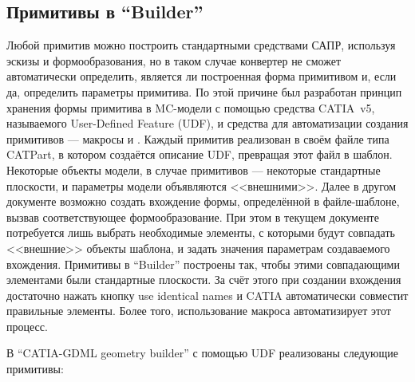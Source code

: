 %                                                

\subsection{Примитивы в ``Builder''}\label{sec:Primitives}

Любой примитив можно построить стандартными средствами САПР, используя эскизы и формообразования, но в таком случае конвертер не сможет автоматически определить, является ли построенная форма примитивом и, если да, определить параметры примитива. По этой причине был разработан принцип хранения формы примитива в MC-модели с помощью средства CATIA~v5, называемого User-Defined Feature (UDF), и средства для автоматизации создания примитивов --- макросы  и . Каждый примитив реализован в своём файле типа CATPart, в котором создаётся описание UDF, превращая этот файл в шаблон. Некоторые объекты модели, в случае примитивов --- некоторые стандартные плоскости, и параметры модели объявляются <<внешними>>. Далее в другом документе возможно создать вхождение формы, определённой в файле-шаблоне, вызвав соответствующее формообразование. При этом в текущем документе потребуется лишь выбрать необходимые элементы, с которыми будут совпадать <<внешние>> объекты шаблона, и задать значения параметрам создаваемого вхождения. Примитивы в ``Builder'' построены так, чтобы этими совпадающими элементами были стандартные плоскости. За счёт этого при создании вхождения достаточно нажать кнопку use identical names и CATIA автоматически совместит правильные элементы. Более того, использование макроса  автоматизирует этот процесс.

В ``CATIA-GDML geometry builder'' с помощью UDF реализованы следующие примитивы:


